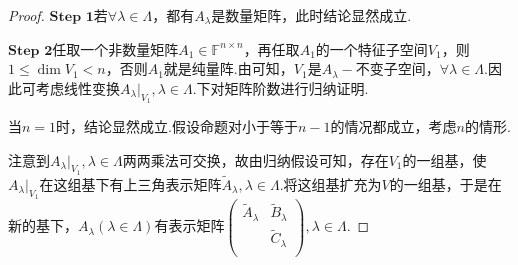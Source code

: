 \documentclass[../../main.tex]{subfiles}%
\begin{document}
\begin{proof}
$\mathbf{Step}\,\,\mathbf{1}$若$\forall \lambda \in \Lambda$，都有$A_{\lambda}$是数量矩阵，此时结论显然成立.

$\mathbf{Step}\,\,\mathbf{2}$任取一个非数量矩阵$A_1\in \mathbb{F} ^{n\times n}$，再任取$A_1$的一个特征子空间$V_1$，则$1\leqslant \dim V_1<n$，否则$A_1$就是纯量阵.由可知，$V_1$是$A_{\lambda}-$不变子空间，$\forall \lambda \in \Lambda$.因此可考虑线性变换$A_{\lambda}|_{V_1},\lambda \in \Lambda$.下对矩阵阶数进行归纳证明.

当$n=1$时，结论显然成立.假设命题对小于等于$n - 1$的情况都成立，考虑$n$的情形.

注意到$A_{\lambda}|_{V_1},\lambda \in \Lambda$两两乘法可交换，故由归纳假设可知，存在$V_1$的一组基，使$A_{\lambda}|_{V_1}$在这组基下有上三角表示矩阵$\widetilde{A}_{\lambda},\lambda \in \Lambda$.将这组基扩充为$V$的一组基，于是在新的基下，$A_{\lambda}\left( \lambda \in \Lambda \right)$有表示矩阵$\begin{pmatrix}
\widetilde{A}_{\lambda}&		\widetilde{B}_{\lambda}\\
&		\widetilde{C}_{\lambda}\\
\end{pmatrix},\lambda \in \Lambda$.


\end{proof}
\end{document}

